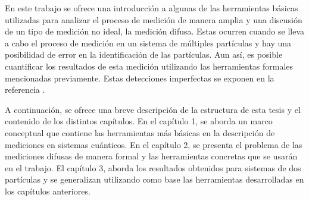 \documentclass[12pt,oneside]{book}\raggedbottom{} %
\begin{document}
\begin{sloppypar}
{{%
En este trabajo se ofrece una introducción a algunas de las herramientas básicas utilizadas para analizar el proceso de medición de manera amplia y una discusión de un tipo de medición no ideal, la medición difusa. Estas ocurren cuando se lleva a cabo el proceso de medición en un sistema de múltiples partículas y hay una posibilidad de error en la identificación de las partículas. Aun así, es posible cuantificar los resultados de esta medición utilizando las herramientas formales mencionadas previamente. Estas detecciones imperfectas se exponen en la referencia {\cite{Pineda_2021}}. %

A continuación, se ofrece una breve descripción de la estructura de esta tesis y el contenido de los distintos capítulos.  En el capítulo 1, se aborda un marco conceptual que contiene las herramientas más básicas en la descripción de mediciones en sistemas cuánticos. En el capítulo 2, se presenta el problema de las mediciones difusas de manera formal y las herramientas concretas que se usarán en el trabajo. El capítulo 3, aborda los resultados obtenidos para sistemas de dos partículas y se generalizan utilizando como base las herramientas desarrolladas en los capítulos anteriores. 















}}
\end{sloppypar}
\end{document}
